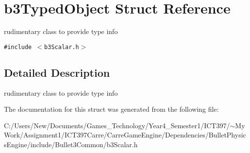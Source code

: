 \hypertarget{structb3_typed_object}{
\section{b3TypedObject Struct Reference}
\label{structb3_typed_object}
}
rudimentary class to provide type info  


{\tt \#include $<$b3Scalar.h$>$}



\subsection{Detailed Description}
rudimentary class to provide type info 

The documentation for this struct was generated from the following file:\begin{CompactItemize}
\item 
C:/Users/New/Documents/Games\_\-Technology/Year4\_\-Semester1/ICT397/$\sim$My Work/Assignment1/ICT397Carre/CarreGameEngine/Dependencies/BulletPhysicsEngine/include/Bullet3Common/b3Scalar.h\end{CompactItemize}
